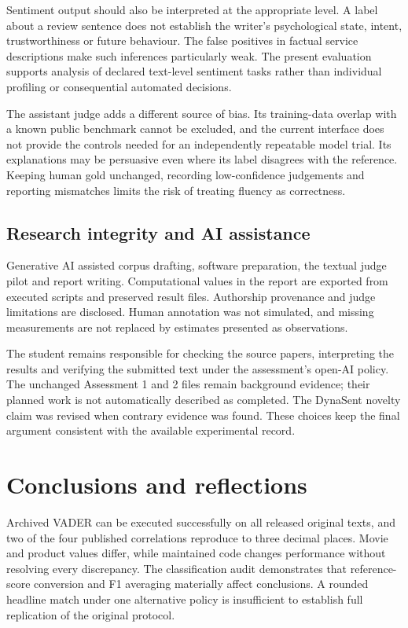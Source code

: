 \documentclass[11pt]{article}
\begin{document}
Sentiment output should also be interpreted at the appropriate level. A label
about a review sentence does not establish the writer's psychological state,
intent, trustworthiness or future behaviour. The false positives in factual
service descriptions make such inferences particularly weak. The present
evaluation supports analysis of declared text-level sentiment tasks rather than
individual profiling or consequential automated decisions.

The assistant judge adds a different source of bias. Its training-data overlap
with a known public benchmark cannot be excluded, and the current interface does
not provide the controls needed for an independently repeatable model trial.
Its explanations may be persuasive even where its label disagrees with the
reference. Keeping human gold unchanged, recording low-confidence judgements
and reporting mismatches limits the risk of treating fluency as correctness.

\subsection{Research integrity and AI assistance}
Generative AI assisted corpus drafting, software preparation, the textual judge
pilot and report writing. Computational values in the report are exported from
executed scripts and preserved result files. Authorship provenance and judge
limitations are disclosed. Human annotation was not simulated, and missing
measurements are not replaced by estimates presented as observations.

The student remains responsible for checking the source papers, interpreting the
results and verifying the submitted text under the assessment's open-AI policy.
The unchanged Assessment 1 and 2 files remain background evidence; their planned
work is not automatically described as completed. The DynaSent novelty claim was
revised when contrary evidence was found. These choices keep the final argument
consistent with the available experimental record.

\section{Conclusions and reflections}
Archived VADER can be executed successfully on all released original texts, and
two of the four published correlations reproduce to three decimal places.
Movie and product values differ, while maintained code changes performance
without resolving every discrepancy. The classification audit demonstrates that
reference-score conversion and F1 averaging materially affect conclusions.
A rounded headline match under one alternative policy is insufficient to establish
full replication of the original protocol.
\end{document}
